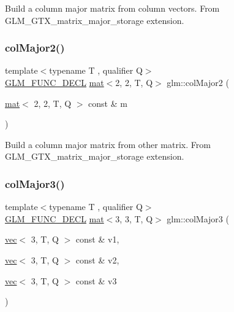 Build a column major matrix from column vectors. From G\+L\+M\+\_\+\+G\+T\+X\+\_\+matrix\+\_\+major\+\_\+storage extension. \mbox{\label{group__gtx__matrix__major__storage_gafc25fd44196c92b1397b127aec1281ab}} 
\subsubsection{\texorpdfstring{col\+Major2()}{colMajor2()}\hspace{0.1cm}{\footnotesize\ttfamily [2/2]}}
{\footnotesize\ttfamily template$<$typename T , qualifier Q$>$ \\
\mbox{\hyperlink{setup_8hpp_ab2d052de21a70539923e9bcbf6e83a51}{G\+L\+M\+\_\+\+F\+U\+N\+C\+\_\+\+D\+E\+CL}} \mbox{\hyperlink{structglm_1_1mat}{mat}}$<$2, 2, T, Q$>$ glm\+::col\+Major2 (\begin{DoxyParamCaption}\item[{\mbox{\hyperlink{structglm_1_1mat}{mat}}$<$ 2, 2, T, Q $>$ const \&}]{m }\end{DoxyParamCaption})}

Build a column major matrix from other matrix. From G\+L\+M\+\_\+\+G\+T\+X\+\_\+matrix\+\_\+major\+\_\+storage extension. \mbox{\label{group__gtx__matrix__major__storage_ga1e25b72b085087740c92f5c70f3b051f}} 
\subsubsection{\texorpdfstring{col\+Major3()}{colMajor3()}\hspace{0.1cm}{\footnotesize\ttfamily [1/2]}}
{\footnotesize\ttfamily template$<$typename T , qualifier Q$>$ \\
\mbox{\hyperlink{setup_8hpp_ab2d052de21a70539923e9bcbf6e83a51}{G\+L\+M\+\_\+\+F\+U\+N\+C\+\_\+\+D\+E\+CL}} \mbox{\hyperlink{structglm_1_1mat}{mat}}$<$3, 3, T, Q$>$ glm\+::col\+Major3 (\begin{DoxyParamCaption}\item[{\mbox{\hyperlink{structglm_1_1vec}{vec}}$<$ 3, T, Q $>$ const \&}]{v1,  }\item[{\mbox{\hyperlink{structglm_1_1vec}{vec}}$<$ 3, T, Q $>$ const \&}]{v2,  }\item[{\mbox{\hyperlink{structglm_1_1vec}{vec}}$<$ 3, T, Q $>$ const \&}]{v3 }\end{DoxyParamCaption})}

